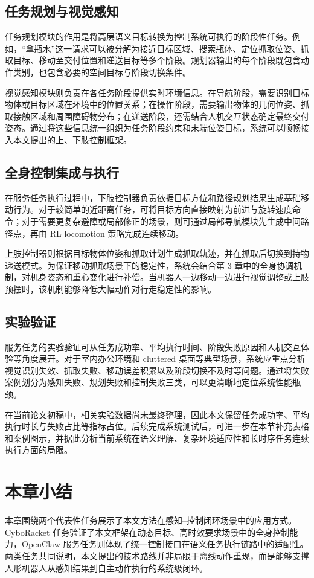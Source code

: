 \subsection{任务规划与视觉感知}

任务规划模块的作用是将高层语义目标转换为控制系统可执行的阶段性任务。例如，“拿瓶水”这一请求可以被分解为接近目标区域、搜索瓶体、定位抓取位姿、抓取目标、移动至交付位置和递送目标等多个阶段。规划器输出的每个阶段既包含动作类别，也包含必要的空间目标与阶段切换条件。

视觉感知模块则负责在各任务阶段提供实时环境信息。在导航阶段，需要识别目标物体或目标区域在环境中的位置关系；在操作阶段，需要输出物体的几何位姿、抓取接触区域和周围障碍物分布；在递送阶段，还需结合人机交互状态确定最终交付姿态。通过将这些信息统一组织为任务阶段约束和末端位姿目标，系统可以顺畅接入本文提出的上、下肢控制框架。

\subsection{全身控制集成与执行}

在服务任务执行过程中，下肢控制器负责依据目标方位和路径规划结果生成基础移动行为。对于较简单的近距离任务，可将目标方向直接映射为前进与旋转速度命令；对于需要更复杂避障或局部修正的场景，则可通过局部导航模块先生成中间路径点，再由 RL locomotion 策略完成连续移动。

上肢控制器则根据目标物体位姿和抓取计划生成抓取轨迹，并在抓取后切换到持物递送模式。为保证移动抓取场景下的稳定性，系统会结合第 3 章中的全身协调机制，对机身姿态和重心变化进行补偿。当机器人一边移动一边进行视觉调整或上肢预摆时，该机制能够降低大幅动作对行走稳定性的影响。

\subsection{实验验证}

服务任务的实验验证可从任务成功率、平均执行时间、阶段失败原因和人机交互体验等角度展开。对于室内办公环境和 cluttered 桌面等典型场景，系统应重点分析视觉识别失效、抓取失败、移动误差积累以及阶段切换不及时等问题。通过将失败案例划分为感知失败、规划失败和控制失败三类，可以更清晰地定位系统性能瓶颈。

在当前论文初稿中，相关实验数据尚未最终整理，因此本文保留任务成功率、平均执行时长与失败占比等指标占位。后续完成系统测试后，可进一步在本节补充表格和案例图示，并据此分析当前系统在语义理解、复杂环境适应性和长时序任务连续执行方面的局限。

\section{本章小结}

本章围绕两个代表性任务展示了本文方法在感知--控制闭环场景中的应用方式。CyboRacket 任务验证了本文框架在动态目标、高时效要求场景中的全身控制能力，OpenClaw 服务任务则体现了统一控制接口在语义任务执行链路中的适配性。两类任务共同说明，本文提出的技术路线并非局限于离线动作重现，而是能够支撑人形机器人从感知结果到自主动作执行的系统级闭环。
